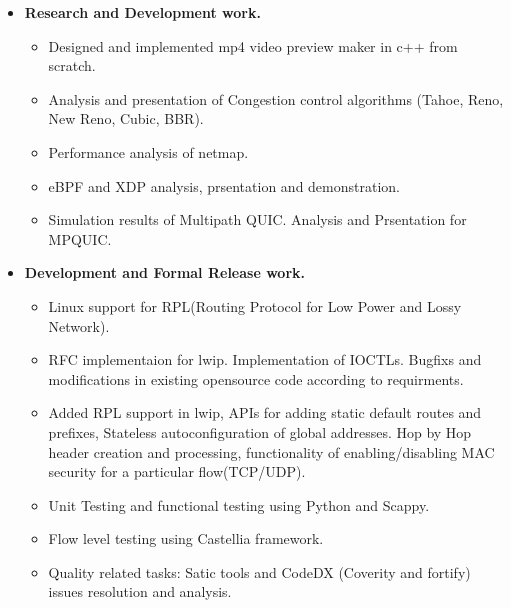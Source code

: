 \begin{itemize}
	\item \textbf{Research and Development work.}\\[-0.6cm]
	\begin{itemize}  	
		\item Designed and implemented mp4 video preview maker in c++ from scratch. \\[-0.5cm]
		\item Analysis and presentation of Congestion control algorithms (Tahoe, Reno, New Reno, Cubic, BBR).\\[-0.5cm]
		\item Performance analysis of netmap.\\[-0.5cm]
		\item eBPF and XDP analysis, prsentation and demonstration.\\[-0.5cm] 
		\item Simulation results of Multipath QUIC. Analysis and Prsentation for MPQUIC.\\[-0.5cm]
	\end{itemize}
	\item \textbf{Development and Formal Release work.} \\[-0.6cm]
	\begin{itemize} 
	 \item Linux support for RPL(Routing Protocol for Low Power and Lossy Network).\\[-0.5cm]
	 \item RFC implementaion for lwip. Implementation of IOCTLs. Bugfixs and modifications in existing opensource code according to requirments.\\[-0.5cm]
	 \item Added RPL support in lwip, APIs for adding static default routes and prefixes, Stateless autoconfiguration of global addresses. Hop by Hop header creation and processing, functionality of enabling/disabling MAC security for a particular flow(TCP/UDP).\\[-0.5cm]
	 \item Unit Testing and functional testing using Python and Scappy.\\[-0.5cm]
	 \item Flow level testing using Castellia framework.\\[-0.5cm]
	 \item Quality related tasks: Satic tools and CodeDX (Coverity and fortify) issues resolution and analysis.\\[-0.5cm]
	\end{itemize}
\end{itemize}
